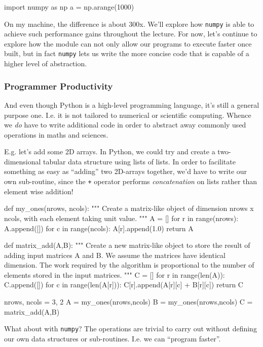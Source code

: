 \documentclass[12pt,letterpaper,twoside]{article}
\begin{document}
\begin{python}
  import numpy as np
  a = np.arange(1000)
\end{python}

On my machine, the difference is about 300x.
We'll explore how \texttt{numpy} is able to achieve such
performance gains throughout the lecture. For now, let's continue to
explore how the module can not only allow our programs to execute
faster once built, but in fact \texttt{numpy} lets us write the more
concise code that is capable of a higher level of abstraction. 

\subsubsection{Programmer Productivity}
And even though Python is a high-level programming language, it's
still a general purpose one. I.e. it is not tailored to numerical or
scientific computing. Whence we \emph{do} have to write additional
code in order to abstract away commonly used operations in maths and
sciences.

E.g. let's add some 2D arrays. 
In Python, we could try and create a two-dimensional tabular data
structure using lists of lists. In order to facilitate something as
easy as ``adding'' two 2D-arrays together, we'd have to write our own
sub-routine, since the \texttt{+} operator performs
\emph{concatenation} on lists rather than element wise addition!

\begin{python}
def my_ones(nrows, ncols):
    """
    Create a matrix-like object of dimension nrows x ncols, with each
    element taking unit value.
    """
    A = []
    for r in range(nrows):
        A.append([])
        for c in range(ncols):
            A[r].append(1.0)
    return A

def matrix_add(A,B):
    """
    Create a new matrix-like object to store the result of adding
    input matrices A and B. We assume the matrices have identical
    dimension. The work required by the algorithm is proportional to
    the number of elements stored in the input matrices.
    """
    C = []
    for r in range(len(A)):
        C.append([])
        for c in range(len(A[r])):
            C[r].append(A[r][c] + B[r][c])
    return C

nrows, ncols = 3, 2
A = my_ones(nrows,ncols)
B = my_ones(nrows,ncols)
C = matrix_add(A,B)
\end{python}

What about with \texttt{numpy}? The operations are trivial to carry
out without defining our own data structures or sub-routines.
I.e. we can ``program faster''.
\end{document}
